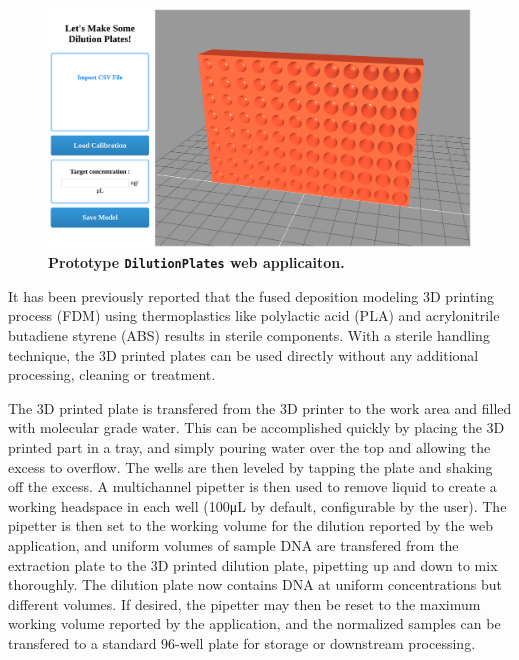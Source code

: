 \begin{refsection}
\begin{figure}
    \centering
    \includegraphics[width=\textwidth]{DilutionPlates/figures/fig1}
    \caption{\textbf{Prototype {\tt DilutionPlates} web applicaiton.}}
    \label{DP_fig1}
\end{figure}

It has been previously reported that the fused deposition modeling 3D printing process (FDM) using thermoplastics like polylactic acid (PLA) and acrylonitrile butadiene styrene (ABS) results in sterile components. \cite{neches2016intrinsic} With a sterile handling technique, the 3D printed plates can be used directly without any additional processing, cleaning or treatment.

The 3D printed plate is transfered from the 3D printer to the work area and filled with molecular grade water. This can be accomplished quickly by placing the 3D printed part in a tray, and simply pouring water over the top and allowing the excess to overflow. The wells are then leveled by tapping the plate and shaking off the excess. A multichannel pipetter is then used to remove liquid to create a working headspace in each well (100\si{\micro\liter} by default, configurable by the user). The pipetter is then set to the working volume for the dilution reported by the web application, and uniform volumes of sample DNA are transfered from the extraction plate to the 3D printed dilution plate, pipetting up and down to mix thoroughly. The dilution plate now contains DNA at uniform concentrations but different volumes. If desired, the pipetter may then be reset to the maximum working volume reported by the application, and the normalized samples can be transfered to a standard 96-well plate for storage or downstream processing.




\end{refsection}
